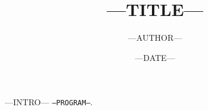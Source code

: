 \documentclass[a4paper,fleqn,12pt]{article}
\title {---TITLE---}
\author{---AUTHOR---}
\date  {---DATE---}
\begin{document}
\maketitle

---INTRO--- \texttt{---PROGRAM---}.

\listoffigures

\tableofcontents
\end{document}
